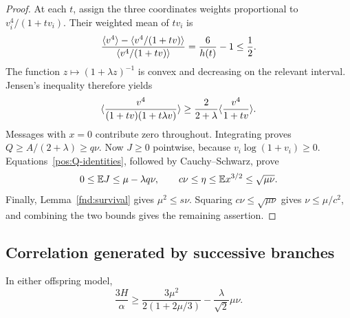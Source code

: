 \begin{proof}
At each \(t\), assign the three coordinates weights proportional to
\(v_i^4/(1+tv_i)\). Their weighted mean of \(tv_i\) is
\[
 \frac{\langle v^4\rangle-\langle v^4/(1+tv)\rangle}{\langle v^4/(1+tv)\rangle}
 =\frac6{h(t)}-1\le\frac12.
\]
The function \(z\mapsto(1+\lambda z)^{-1}\) is convex and decreasing
on the relevant interval. Jensen's inequality therefore yields
\[
 \langle \frac{v^4}{(1+tv)(1+t\lambda v)}\rangle
 \ge\frac{2}{2+\lambda}\langle \frac{v^4}{1+tv}\rangle.
\]
Messages with \(x=0\) contribute zero throughout. Integrating proves
\(Q\ge A/(2+\lambda)\ge q\nu\). Now \(J\ge0\) pointwise, because
\(v_i\log(1+v_i)\ge0\). Equations~\eqref{pos:Q-identities}, followed by
Cauchy--Schwarz, prove
\[
 0\le\mathbb E J\le\mu-\lambda q\nu,
 \qquad c\nu\le\eta\le\mathbb E x^{3/2}\le\sqrt{\mu\nu}.
\]
Finally, Lemma~\ref{fnd:survival} gives \(\mu^2\le s\nu\). Squaring
\(c\nu\le\sqrt{\mu\nu}\) gives \(\nu\le\mu/c^2\), and combining
the two bounds gives the remaining assertion.
\end{proof}

\subsection{Correlation generated by successive branches}

\begin{lemma}\label{pos:correlation-bound}
In either offspring model,
\begin{equation}\label{pos:H-bound}
 \frac{3H}{\alpha}\ge
 \frac{3\mu^2}{2(1+2\mu/3)}-\frac\lambda{\sqrt2}\mu\nu.
\end{equation}
\end{lemma}

